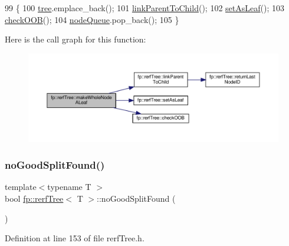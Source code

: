\begin{DoxyCode}
99                                                 \{
100                     \hyperlink{classfp_1_1rerfTree_afc9392154cb4d1dde02e26a9ec31e356}{tree}.emplace\_back();
101                     \hyperlink{classfp_1_1rerfTree_a7750b048cb8beaada5279f3a702f6cc2}{linkParentToChild}();
102                     \hyperlink{classfp_1_1rerfTree_a85c0f3ee590d5cd8524b0a7e80cffcaf}{setAsLeaf}();
103                     \hyperlink{classfp_1_1rerfTree_a57086b38168e07aaf9cd9e9f1842058d}{checkOOB}();
104                     \hyperlink{classfp_1_1rerfTree_a59b3bdcba86acbe93fd46658132218a8}{nodeQueue}.pop\_back();
105                 \}
\end{DoxyCode}
Here is the call graph for this function\+:
\nopagebreak
\begin{figure}[H]
\begin{center}
\leavevmode
\includegraphics[width=350pt]{classfp_1_1rerfTree_a2cc428162305a46d79268addda902688_cgraph}
\end{center}
\end{figure}
\mbox{\label{classfp_1_1rerfTree_aa266b3629b914f4ad01d8b1933a85ee2}} 
\subsubsection{\texorpdfstring{no\+Good\+Split\+Found()}{noGoodSplitFound()}}
{\footnotesize\ttfamily template$<$typename T $>$ \\
bool \hyperlink{classfp_1_1rerfTree}{fp\+::rerf\+Tree}$<$ T $>$\+::no\+Good\+Split\+Found (\begin{DoxyParamCaption}{ }\end{DoxyParamCaption})\hspace{0.3cm}{\ttfamily [inline]}}



Definition at line 153 of file rerf\+Tree.\+h.



